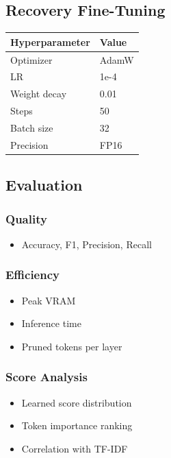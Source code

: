 \subsection{Recovery Fine-Tuning}

\begin{table}[H]
\centering
\small
\begin{tabular}{ll}
\toprule
\textbf{Hyperparameter} & \textbf{Value} \\
\midrule
Optimizer & AdamW \\
LR & 1e-4 \\
Weight decay & 0.01 \\
Steps & 50 \\
Batch size & 32 \\
Precision & FP16 \\
\bottomrule
\end{tabular}
\end{table}

\subsection{Evaluation}

\subsubsection{Quality}
\begin{itemize}
\item Accuracy, F1, Precision, Recall

\end{itemize}
\subsubsection{Efficiency}
\begin{itemize}
\item Peak VRAM
\item Inference time
\item Pruned tokens per layer

\end{itemize}
\subsubsection{Score Analysis}
\begin{itemize}
\item Learned score distribution
\item Token importance ranking
\item Correlation with TF-IDF

\end{itemize}
